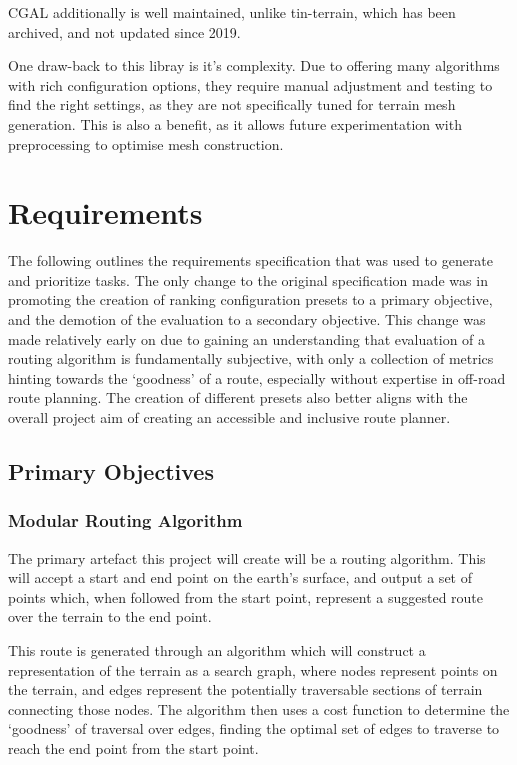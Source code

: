 \documentclass[12pt]{article}
\begin{document}
CGAL additionally is well maintained, unlike tin-terrain, which has been archived, and not updated since 2019.

One draw-back to this libray is it's complexity. Due to offering many algorithms with rich configuration options, they require manual adjustment and testing to find the right settings, as they are not specifically tuned for terrain mesh generation. This is also a benefit, as it allows future experimentation with preprocessing to optimise mesh construction.

\section{Requirements}

The following outlines the requirements specification that was used to generate and prioritize tasks. The only change to the original specification made was in promoting the creation of ranking configuration presets to a primary objective, and the demotion of the evaluation to a secondary objective. This change was made relatively early on due to gaining an understanding that evaluation of a routing algorithm is fundamentally subjective, with only a collection of metrics hinting towards the `goodness' of a route, especially without expertise in off-road route planning. The creation of different presets also better aligns with the overall project aim of creating an accessible and inclusive route planner.

\subsection{Primary Objectives}

\subsubsection{Modular Routing Algorithm}

The primary artefact this project will create will be a routing algorithm. This will accept a start and end point on the earth's surface, and output a set of points which, when followed from the start point, represent a suggested route over the terrain to the end point.

This route is generated through an algorithm which will construct a representation of the terrain as a search graph, where nodes represent points on the terrain, and edges represent the potentially traversable sections of terrain connecting those nodes. The algorithm then uses a cost function to determine the `goodness' of traversal over edges, finding the optimal set of edges to traverse to reach the end point from the start point.
\end{document}
